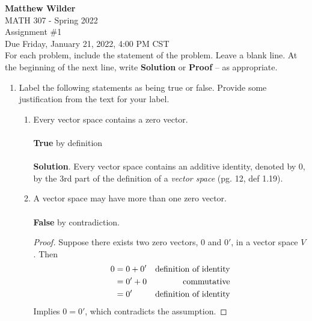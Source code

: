 \documentclass[12pt]{article}
\begin{document}
\pagestyle{fancy}
\fancyhf{}
\fancyfoot[LE,CO]{\thepage}

\noindent \textbf{Matthew Wilder}\\MATH 307 - Spring 2022 \\
Assignment \#1 \\
Due Friday, January 21, 2022, 4:00 PM CST \\

For each problem, include the statement of the problem. Leave a blank line.  At the beginning of the next line, write \textbf{Solution} or \textbf{Proof} -- as appropriate.

\begin{enumerate}
\item Label the following statements as being true or false.
Provide some justification from the text for your label.
    \begin{enumerate}
        \item Every vector space contains a zero vector.\\
            \\\textbf{True} by definition\\\\\textbf{Solution}. Every vector space contains an additive identity, denoted by $0$, by the 3rd part of the definition of a \textit{vector space} (pg. 12, def 1.19).\vspace{.4in}
        \item A vector space may have more than one zero vector.\\
            \\\textbf{False} by contradiction.
            \begin{proof}
                    Suppose there exists two zero vectors, $0$ and $0'$, in a vector space $V$. Then
                    \begin{align}
                        0 &= 0 + 0' & \text{definition of identity}\notag\\
                        &= 0' + 0 & \text{commutative} \notag\\
                        &= 0' & \text{definition of identity}\notag
                    \end{align}
                    Implies $0 = 0'$, which contradicts the assumption.
            \end{proof}\vspace{.4in}

\end{enumerate}
\end{enumerate}
\end{document}
